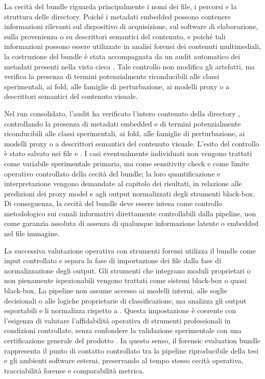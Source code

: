 La cecità del bundle riguarda principalmente i nomi dei file, i percorsi e la
struttura delle directory. Poiché i metadati embedded possono contenere
informazioni rilevanti sul dispositivo di acquisizione, sul software di
elaborazione, sulla provenienza o su descrittori semantici del contenuto, e
poiché tali informazioni possono essere utilizzate in analisi forensi dei
contenuti multimediali, la costruzione del bundle è stata accompagnata da un
audit automatico dei metadati presenti nella vista cieca
\cite{xiang2021forensicmetadata,lee2023forensicmethodology,zheng2023exif}.
Tale controllo non modifica gli artefatti, ma verifica la presenza di termini
potenzialmente riconducibili alle classi sperimentali, ai fold, alle famiglie di
perturbazione, ai modelli proxy o a descrittori semantici del contenuto visuale.

Nel run consolidato, l'audit ha verificato l'intero contenuto della directory
, controllando la presenza di metadati
embedded e di termini potenzialmente riconducibili alle classi sperimentali, ai
fold, alle famiglie di perturbazione, ai modelli proxy o a descrittori semantici
del contenuto visuale. L'esito del controllo è stato salvato nei file
 e
. I casi eventualmente
individuati non vengono trattati come variabile sperimentale primaria, ma come
sensitivity check e come limite operativo controllato della cecità del bundle;
la loro quantificazione e interpretazione vengono demandate al capitolo dei
risultati, in relazione alle predizioni dei proxy model e agli output
normalizzati degli strumenti black-box.
Di conseguenza, la cecità del bundle deve essere intesa come controllo
metodologico sui canali informativi direttamente controllabili dalla pipeline,
non come garanzia assoluta di assenza di qualunque informazione latente o
embedded nel file immagine.

La successiva valutazione operativa con strumenti forensi utilizza il bundle
come input controllato e separa la fase di importazione dei file dalla
fase di normalizzazione degli output. Gli strumenti che integrano moduli proprietari o non pienamente ispezionabili
vengono trattati come sistemi black-box o quasi black-box. La pipeline non
assume accesso ai modelli interni, alle soglie decisionali o alle logiche
proprietarie di classificazione, ma analizza gli output esportabili e li
normalizza rispetto a
.
Questa impostazione è coerente con l'esigenza di valutare l'affidabilità
operativa di strumenti professionali in condizioni controllate, senza confondere
la validazione sperimentale con una certificazione generale del prodotto
\cite{sanna2024preliminary,sanna2025pixelperfect}.
In questo senso, il forensic evaluation bundle rappresenta il punto di
contatto controllato tra la pipeline riproducibile della tesi e gli ambienti
software esterni, preservando al tempo stesso cecità operativa, tracciabilità
forense e comparabilità metrica.


